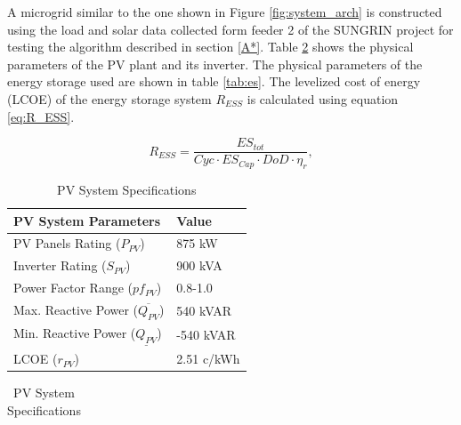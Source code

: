 A microgrid similar to the one shown in Figure \ref{fig:system_arch} is constructed using the load and solar data collected form feeder 2 of the SUNGRIN project \cite{SUNGRIN} for testing the algorithm described in section \ref{A*}. Table \ref{tab:solar_pv} shows the physical parameters of the PV plant and its inverter. The physical parameters of the energy storage used are shown in table \ref{tab:es}. The levelized cost of energy (LCOE)  of the energy storage system $R_{ESS}$ is calculated using equation \ref{eq:R_ESS}.

\begin{equation}
\label{eq:R_ESS}
R_{ESS} = \dfrac{ES_{tot}}{Cyc\cdot ES_{Cap}\cdot DoD\cdot \eta_{r}},
\end{equation}

\begin{table}[htb]
\normalsize
\renewcommand{\arraystretch}{1}
\caption{PV System Specifications}
\label{tab:solar_pv}
\centering
    \begin{tabular}{ | l | p{3cm} | }
    \hline
    \textbf{PV System Parameters} & \textbf{Value} \\ \hline
    PV Panels Rating (\(P_{PV}\)) & 875 kW  \\ \hline
    Inverter Rating (\(S_{PV}\)) & 900 kVA \\ \hline
    Power Factor Range (\(pf_{PV}\)) & 0.8-1.0  \\ \hline
    Max. Reactive Power (\(\overline{Q_{PV}}\)) & 540 kVAR \\ \hline
    Min. Reactive Power (\(\underline{Q_{PV}}\)) & -540 kVAR \\ \hline
    LCOE (\(r_{PV}\)) & 2.51 c/kWh \\ \hline
    \end{tabular}
    \begin{tabular}{l}
    \end{tabular}
\end{table}


